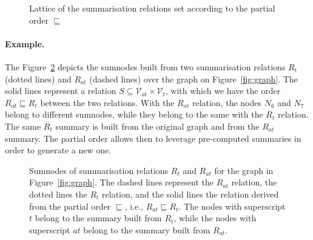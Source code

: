 \begin{figure}
	\centering
	
	\caption{Lattice of the summarisation relations set according to the partial order $\sqsubseteq$}
	\label{fig:lattice}
\end{figure}

\paragraph{Example.}

The Figure~\ref{fig:rel-order} depicts the sumnodes built from two summarisation relations $R_t$ (dotted lines) and $R_{at}$ (dashed lines) over the graph on Figure~\ref{fig:graph}. The solid lines represent a relation $S \subseteq \mathcal{V}_{at} \times \mathcal{V}_t$, with which we have the order $R_{at} \sqsubseteq R_t$ between the two relations. With the $R_{at}$ relation, the nodes $N_6$ and $N_7$ belong to different sumnodes, while they belong to the same with the $R_t$ relation. The same $R_t$ summary is built from the original graph and from the $R_{at}$ summary. The partial order allows then to leverage pre-computed summaries in order to generate a new one.

\begin{figure}
	\centering
	
	\caption{Sumnodes of summarisation relations $R_t$ and $R_{at}$ for the graph in Figure~\ref{fig:graph}. The dashed lines represent the $R_{at}$ relation, the dotted lines the $R_t$ relation, and the solid lines the relation derived from the partial order $\sqsubseteq$, i.e., $R_{at} \sqsubseteq R_t$. The nodes with superscript $t$ belong to the summary built from $R_t$, while the nodes with superscript $at$ belong to the summary built from $R_{at}$.}
	\label{fig:rel-order}
\end{figure}
